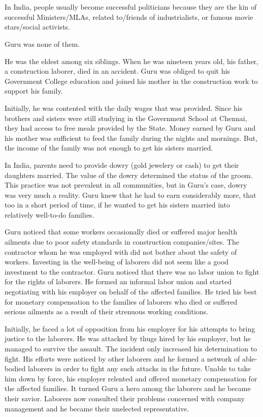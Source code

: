 \chapter{}

In India, people usually become successful politicians because they are the kin
of successful Ministers/MLAs, related to/friends of industrialists, or famous
movie stars/social activists.

Guru was none of them.

He was the eldest among six siblings. When he was nineteen years old, his
father, a construction laborer, died in an accident. Guru was obliged to quit
his Government College education and joined his mother in the construction work
to support his family.

Initially, he was contented with the daily wages that was provided. Since his
brothers and sisters were still studying in the Government School at Chennai,
they had access to free meals provided by the State. Money earned by Guru and
his mother was sufficient to feed the family during the nights and mornings.
But, the income of the family was not enough to get his sisters married.

In India, parents need to provide dowry (gold jewelery or cash) to get their
daughters married. The value of the dowry determined the status of the groom.
This practice was not prevalent in all communities, but in Guru's case, dowry
was very much a reality. Guru knew that he had to earn considerably more, that
too in a short period of time, if he wanted to get his sisters married into
relatively well-to-do families.

Guru noticed that some workers occasionally died or suffered major health
ailments due to poor safety standards in construction companies/sites. The
contractor whom he was employed with did not bother about the safety of workers.
Investing in the well-being of laborers did not seem like a good investment to
the contractor. Guru noticed that there was no labor union to fight for the
rights of laborers. He formed an informal labor union and started negotiating
with his employer on behalf of the affected families. He tried his best for
monetary compensation to the families of laborers who died or suffered serious
ailments as a result of their strenuous working conditions.

Initially, he faced a lot of opposition from his employer for his attempts to
bring justice to the laborers. He was attacked by thugs hired by his employer,
but he managed to survive the assault. The incident only increased his
determination to fight. His efforts were noticed by other laborers and he formed
a network of able-bodied laborers in order to fight any such attacks in the
future. Unable to take him down by force, his employer relented and offered
monetary compensation for the affected families. It turned Guru a hero among the
laborers and he became their savior. Laborers now consulted their problems
concerned with company management and he became their unelected representative.

